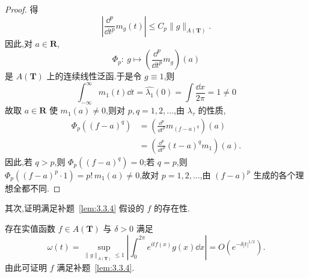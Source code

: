 \begin{proof}
得
\begin{equation*}
\left|\frac{\dd^{p}}{\dd t^{p}}m_{g}(t)\right| \leq C_{p}\|g\|_{A(\mathbf{T})}.
\end{equation*}
因此,对 $a \in \mathbf{R}$,
\begin{equation*}
\Phi_{p}:\ g \mapsto \left(\frac{\dd^{p}}{\dd t^{p}}m_{g}\right)(a)
\end{equation*}
是 $A(\mathbf{T})$ 上的连续线性泛函.于是令 $g \equiv 1$,则
\begin{equation*}
\int_{-\infty}^{\infty}m_{1}(t)\dd t = \widehat{\lambda_{1}}(0) = \int \frac{\dd x}{2\pi} = 1 \neq 0
\end{equation*}
故取 $a \in \mathbf{R}$ 使 $m_{1}(a) \neq 0$,则对 $p, q = 1, 2, \ldots$,由 $\lambda_{\tau}$ 的性质,
\begin{align*}
\Phi_{p}((f - a)^{q}) & = \left(\frac{\dd^{p}}{\dd t^{p}}m_{(f-a)^{q}}\right)(a) \\
& = \left(\frac{\dd^{p}}{\dd t^{p}}(t - a)^{q}m_{1}\right)(a).
\end{align*}
因此,若 $q > p$,则 $\Phi_{p}((f - a)^{q}) = 0$;若 $q = p$,则 $\Phi_{p}((f - a)^{p} \cdot 1) = p!\,m_{1}(a) \neq 0$,故对 $p = 1, 2, \ldots$,由 $(f - a)^{p}$ 生成的各个理想全都不同.
\end{proof}

其次,证明满足补题~\ref{lem:3.3.4} 假设的 $f$ 的存在性.

\begin{lemma}\label{lem:3.3.5}
存在实值函数 $f \in A(\mathbf{T})$ 与 $\delta > 0$ 满足
\begin{equation*}
\omega(t) = \sup_{\|g\|_{A(\mathbf{T})} \leq 1}\left|\int_{0}^{2\pi}e^{itf(x)}g(x)\dd x\right| = O\left(e^{-\delta|t|^{1/2}}\right).
\end{equation*}
由此可证明 $f$ 满足补题~\ref{lem:3.3.4}.
\end{lemma}

